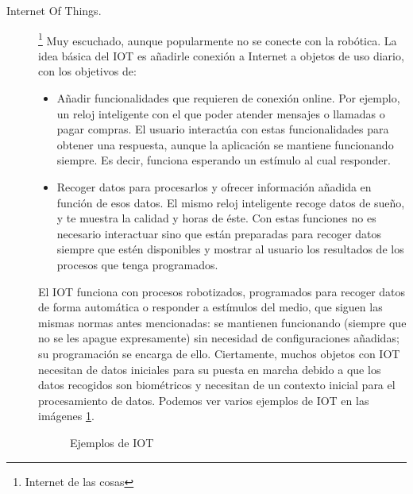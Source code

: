 \begin{description}
	\item [Internet Of Things.]\footnote{Internet de las cosas} Muy escuchado, aunque popularmente no se conecte con la robótica. La idea básica del IOT es añadirle conexión a Internet a objetos de uso diario, con los objetivos de:
	\begin{itemize}
		\item Añadir funcionalidades que requieren de conexión online. Por ejemplo, un reloj inteligente con el que poder atender mensajes o llamadas o pagar compras. El usuario interactúa con estas funcionalidades para obtener una respuesta, aunque la aplicación se mantiene funcionando siempre. Es decir, funciona esperando un estímulo al cual responder.
		\item Recoger datos para procesarlos y ofrecer información añadida en función de esos datos. El mismo reloj inteligente recoge datos de sueño, y te muestra la calidad y horas de éste. Con estas funciones no es necesario interactuar sino que están preparadas para recoger datos siempre que estén disponibles y mostrar al usuario los resultados de los procesos que tenga programados.
	\end{itemize}
	El IOT funciona con procesos robotizados, programados para recoger datos de forma automática o responder a estímulos del medio, que siguen las mismas normas antes mencionadas: se mantienen funcionando (siempre que no se les apague expresamente) sin necesidad de configuraciones añadidas; su programación se encarga de ello. Ciertamente, muchos objetos con IOT necesitan de datos iniciales para su puesta en marcha debido a que los datos recogidos son biométricos y necesitan de un contexto inicial para el procesamiento de datos. Podemos ver varios ejemplos de IOT en las imágenes \ref{img:IOT}.
	\begin{figure}[h]
		\centering
		\begin{subfigure}
			[Información de la calidad del sueño proporcionada por un reloj inteligente] {
			\texttt{[image: IOT1.jpg]}
			\label{img:IOT1}}
		\end{subfigure}
		\begin{subfigure}
			[Báscula inteligente que procesa los datos almacenados] {
			\texttt{[image: IOT2.jpg]}
			\label{img:IOT2}}
		\end{subfigure}
		\newline
		\begin{subfigure}[c]
			[Aplicación conectada a un sensor de glucosa para controlar el nivel de azúcar] {
			\texttt{[image: IOT3.jpeg]}
			\label{img:IOT3}}
		\end{subfigure}
		\caption{Ejemplos de IOT}
		\label{img:IOT}
	\end{figure}


\end{description}

